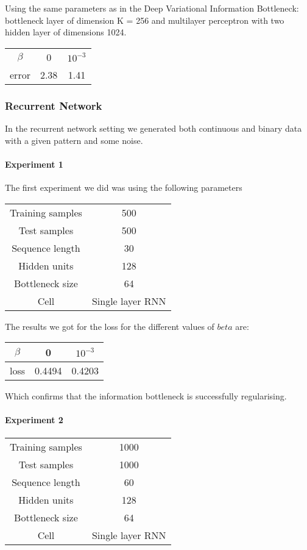 \documentclass[a4paper]{article}
\begin{document}
Using the same parameters as in the Deep Variational Information Bottleneck: bottleneck layer of dimension K = 256 and multilayer perceptron with two hidden layer of dimensions 1024.

\begin{center}
\begin{tabular}{ c | c c }
 $\beta$ & 0 & $10^{-3}$ \\ 
 error &  2.38 &  1.41 \\  
\end{tabular}
\end{center}

\subsubsection{Recurrent Network}

In the recurrent network setting we generated both continuous and binary data with a given pattern and some noise.

\paragraph{Experiment 1}
The first experiment we did was using the following parameters

\begin{center}
\begin{tabular}{ c | c  }
 Training samples & 500 \\ 
 Test samples &  500 \\
 Sequence length & 30 \\
 Hidden units & 128 \\
 Bottleneck size & 64 \\
 Cell & Single layer RNN
\end{tabular}
\end{center}

The results we got for the loss for the different values of $beta$ are:
\begin{center}
\begin{tabular}{ c | c c }
 $\beta$ & 0 & $10^{-3}$ \\ 
  \hline
 loss & 0.4494 &  0.4203 \\  
\end{tabular}
\end{center}

Which confirms that the information bottleneck is successfully regularising.

\paragraph{Experiment 2}
\begin{center}
\begin{tabular}{ c | c  }
 Training samples & 1000 \\ 
 Test samples &  1000 \\
 Sequence length & 60 \\
 Hidden units & 128 \\
 Bottleneck size & 64 \\
 Cell & Single layer RNN
\end{tabular}
\end{center}
\end{document}

